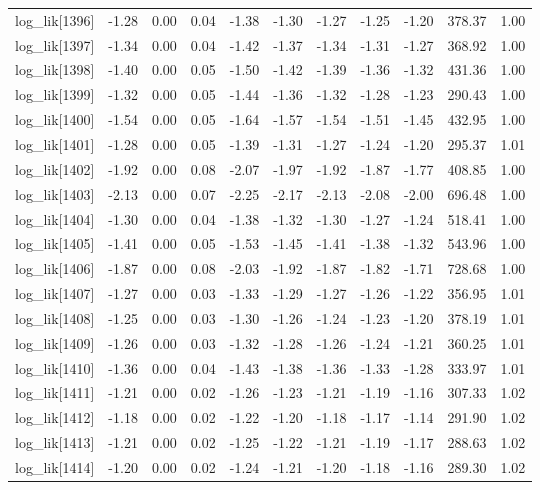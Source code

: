 \begin{table}[ht]
\begin{tabular}{rrrrrrrrrrr}
  log\_lik[1396] & -1.28 & 0.00 & 0.04 & -1.38 & -1.30 & -1.27 & -1.25 & -1.20 & 378.37 & 1.00 \\ 
  log\_lik[1397] & -1.34 & 0.00 & 0.04 & -1.42 & -1.37 & -1.34 & -1.31 & -1.27 & 368.92 & 1.00 \\ 
  log\_lik[1398] & -1.40 & 0.00 & 0.05 & -1.50 & -1.42 & -1.39 & -1.36 & -1.32 & 431.36 & 1.00 \\ 
  log\_lik[1399] & -1.32 & 0.00 & 0.05 & -1.44 & -1.36 & -1.32 & -1.28 & -1.23 & 290.43 & 1.00 \\ 
  log\_lik[1400] & -1.54 & 0.00 & 0.05 & -1.64 & -1.57 & -1.54 & -1.51 & -1.45 & 432.95 & 1.00 \\ 
  log\_lik[1401] & -1.28 & 0.00 & 0.05 & -1.39 & -1.31 & -1.27 & -1.24 & -1.20 & 295.37 & 1.01 \\ 
  log\_lik[1402] & -1.92 & 0.00 & 0.08 & -2.07 & -1.97 & -1.92 & -1.87 & -1.77 & 408.85 & 1.00 \\ 
  log\_lik[1403] & -2.13 & 0.00 & 0.07 & -2.25 & -2.17 & -2.13 & -2.08 & -2.00 & 696.48 & 1.00 \\ 
  log\_lik[1404] & -1.30 & 0.00 & 0.04 & -1.38 & -1.32 & -1.30 & -1.27 & -1.24 & 518.41 & 1.00 \\ 
  log\_lik[1405] & -1.41 & 0.00 & 0.05 & -1.53 & -1.45 & -1.41 & -1.38 & -1.32 & 543.96 & 1.00 \\ 
  log\_lik[1406] & -1.87 & 0.00 & 0.08 & -2.03 & -1.92 & -1.87 & -1.82 & -1.71 & 728.68 & 1.00 \\ 
  log\_lik[1407] & -1.27 & 0.00 & 0.03 & -1.33 & -1.29 & -1.27 & -1.26 & -1.22 & 356.95 & 1.01 \\ 
  log\_lik[1408] & -1.25 & 0.00 & 0.03 & -1.30 & -1.26 & -1.24 & -1.23 & -1.20 & 378.19 & 1.01 \\ 
  log\_lik[1409] & -1.26 & 0.00 & 0.03 & -1.32 & -1.28 & -1.26 & -1.24 & -1.21 & 360.25 & 1.01 \\ 
  log\_lik[1410] & -1.36 & 0.00 & 0.04 & -1.43 & -1.38 & -1.36 & -1.33 & -1.28 & 333.97 & 1.01 \\ 
  log\_lik[1411] & -1.21 & 0.00 & 0.02 & -1.26 & -1.23 & -1.21 & -1.19 & -1.16 & 307.33 & 1.02 \\ 
  log\_lik[1412] & -1.18 & 0.00 & 0.02 & -1.22 & -1.20 & -1.18 & -1.17 & -1.14 & 291.90 & 1.02 \\ 
  log\_lik[1413] & -1.21 & 0.00 & 0.02 & -1.25 & -1.22 & -1.21 & -1.19 & -1.17 & 288.63 & 1.02 \\ 
  log\_lik[1414] & -1.20 & 0.00 & 0.02 & -1.24 & -1.21 & -1.20 & -1.18 & -1.16 & 289.30 & 1.02 \\ 

\end{tabular}
\end{table}
